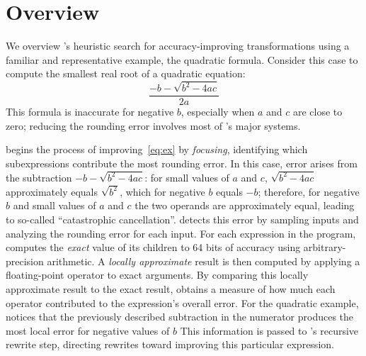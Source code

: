 \documentclass[paper.tex]{subfiles}
\begin{document}
\section{Overview}
\label{sec:overview}

We overview \casio's heuristic search for accuracy-improving
transformations using a familiar and representative example, the
quadratic formula.  Consider this case to compute the smallest real
root of a quadratic equation:
\begin{equation}\label{eq:ex}
  \frac{-b - \sqrt{b^2 - 4ac}}
  {2a}
\end{equation}
This formula is inaccurate for negative $b$, especially when $a$ and
$c$ are close to zero; reducing the rounding error involves most of
\casio's major systems.

\casio begins the process of improving~\eqref{eq:ex} by
\textit{focusing}, identifying which subexpressions contribute the
most rounding error.  In this case, error arises from the subtraction
$-b - \sqrt{b^2 - 4ac}$: for small values of $a$ and $c$, $\sqrt{b^2 -
  4ac}$ approximately equals $\sqrt{b^2}$, which for negative $b$
equals $-b$; therefore, for negative $b$ and small values of $a$ and
$c$ the two operands are approximately equal, leading to so-called
``catastrophic cancellation''.  \casio detects this error by sampling
inputs and analyzing the rounding error for each input.  For each
expression in the program, \casio computes the \textit{exact} value of
its children to 64 bits of accuracy using arbitrary-precision
arithmetic.  A \emph{locally approximate} result is then computed by
applying a floating-point operator to exact arguments.  By comparing
this locally approximate result to the exact result, \casio obtains a
measure of how much each operator contributed to the expression's
overall error.  For the quadratic example, \casio notices that the
previously described subtraction in the numerator produces the most
local error for negative values of $b$ This information is passed to
\casio's recursive rewrite step, directing rewrites toward improving
this particular expression.
\end{document}
